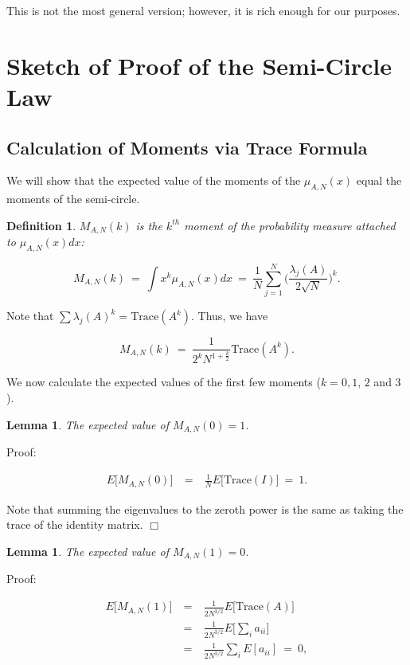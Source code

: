 \documentclass[12pt,letterpaper]{report}
\newcommand\be{\begin{equation}}
\newcommand\ee{\end{equation}}
\newcommand\bea{\begin{eqnarray}}
\newcommand\eea{\end{eqnarray}}
\newtheorem{lem}[thm]{Lemma}
\newtheorem{defi}[thm]{Definition}
\begin{document}
This is not the most general version; however, it is rich enough
for our purposes.

\section{Sketch of Proof of the Semi-Circle Law}

\subsection{Calculation of Moments via Trace Formula}

We will show that the expected value of the moments of the
$\mu_{A,N}(x)$ equal the moments of the semi-circle.

\begin{defi} $M_{A,N}(k)$ is the $k^{th}$ moment of the probability
measure attached to $\mu_{A,N}(x)dx$:

\be M_{A,N}(k) \ = \ \int x^k \mu_{A,N}(x)dx  \ =  \ \frac{1}{N}
\sum_{j=1}^N \Big( \frac{\lambda_j(A)}{2\sqrt{N}} \Big)^k. \ee
\end{defi}

Note that $\sum \lambda_j(A)^k = \text{Trace}(A^k)$. Thus, we have

\be M_{A,N}(k) \ = \ \frac{1}{2^k N^{1 + \frac{k}{2}}}
\text{Trace}(A^k). \ee

We now calculate the expected values of the first few moments ($k
= 0, 1$, $2$ and $3$).

\begin{lem} The expected value of $M_{A,N}(0) = 1$. \end{lem}

Proof:

\bea E\Big[M_{A,N}(0)\Big] & \ = \ & \frac{1}{N}
E\Big[\text{Trace}(I)\Big] \ = \ 1. \eea

Note that summing the eigenvalues to the zeroth power is the same
as taking the trace of the identity matrix. $\Box$

\begin{lem}The expected value of $M_{A,N}(1) = 0$. \end{lem}

Proof:

\bea E\Big[M_{A,N}(1)\Big] & \ = \ & \frac{1}{2N^{3/2}}
E\Big[\text{Trace}(A)\Big] \nonumber\\ & \ = \ &
\frac{1}{2N^{3/2}} E\Big[ \sum_i a_{ii} \Big] \nonumber\\ & \ = \
& \frac{1}{2N^{3/2}} \sum_i E[a_{ii}] \ = \ 0, \eea
\end{document}
